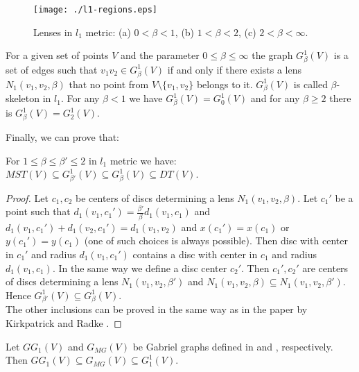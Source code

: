 \documentclass[11pt]{llncs}
\begin{document}
\begin{figure}[htbp]
\centering
\texttt{[image: ./l1-regions.eps]}
\caption{Lenses in $l_1$ metric: (a) $0 < \beta < 1$, (b) $1 <\beta < 2$,
(c) $2 < \beta < \infty$.}
\label{fig:l_1}
\end{figure}


\begin{corollary}
\label{equality}
For a given set of points $V$ and the parameter $0 \leq \beta \leq \infty$ the graph 
$G_{\beta}^1(V)$ is a set of edges such that $v_1v_2 \in G_{\beta}^1(V)$ if and only if 
there exists a lens $N_1(v_1, v_2,\beta)$ that no point from $V \setminus \{v_1, v_2\}$ belongs 
to it. $G_{\beta}^1(V)$ is called $\beta$-skeleton in $l_1$.
For any $\beta < 1$ we have $G_{\beta}^1(V)=G_{0}^1(V)$ and for any $\beta \geq 2$ there is 
$G_{\beta}^1(V)=G_{2}^1(V)$.
\end{corollary}

Finally, we can prove that:

\begin{lemma}
\label{finalequalityl1}
For $1 \leq \beta \leq \beta' \leq 2$ in $l_1$ metric we have:\\
$MST(V) \subseteq G_{\beta'}^1(V) \subseteq G_{\beta}^1(V) \subseteq DT(V)$.
\end{lemma}
\begin{proof}  
Let $c_1, c_2$ be centers of discs determining a lens $N_1(v_1,v_2,\beta)$.
Let $c_1'$ be a point such that $d_1(v_1,c_1')=\frac{\beta'}{\beta}d_1(v_1,c_1)$
and $d_1(v_1,c_1')+d_1(v_2,c_1')=d_1(v_1,v_2)$
and $x(c_1')=x(c_1)$ or $y(c_1')=y(c_1)$ (one of such choices is always possible).
Then disc with center in $c_1'$ and radius $d_1(v_1,c_1')$ contains a disc with center
in $c_1$ and radius $d_1(v_1,c_1)$. 
In the same way we define a disc center $c_2'$.  
Then $c_1', c_2'$ are centers of discs determining a lens $N_1(v_1,v_2,\beta')$
and $N_1(v_1,v_2,\beta) \subseteq N_1(v_1,v_2,\beta')$. 
Hence $G_{\beta'}^1(V) \subseteq G_{\beta}^1(V)$. \\
The other inclusions can be proved in the same way as in the paper by Kirkpatrick and Radke 
\cite{kr85}.    
\end{proof} 

\begin{corollary}
Let $GG_1(V)$ and $G_{MG}(V)$ be Gabriel graphs defined in \cite{w06} and \cite{mg11}, respectively.
Then $GG_1(V) \subseteq G_{MG}(V) \subseteq G_1^1(V)$.
\end{corollary}
\end{document}
